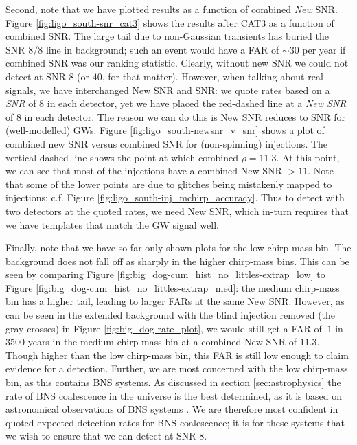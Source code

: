 Second, note that we have plotted results as a function of combined \emph{New}
\ac{SNR}. Figure \ref{fig:ligo_south-snr_cat3} shows the results after CAT3 as
a function of combined \ac{SNR}. The large tail due to non-Gaussian transients
has buried the \ac{SNR} 8/8 line in background; such an event would have a
\ac{FAR} of $\sim30$ per year if combined \ac{SNR} was our ranking statistic.
Clearly, without new \ac{SNR} we could not detect at \ac{SNR} $8$ (or $40$, for
that matter). However, when talking about real signals, we have interchanged
New \ac{SNR} and \ac{SNR}: we quote rates based on a \emph{\ac{SNR}} of $8$ in
each detector, yet we have placed the red-dashed line at a \emph{New \ac{SNR}}
of $8$ in each detector. The reason we can do this is New \ac{SNR} reduces to
\ac{SNR} for (well-modelled) \acp{GW}. Figure \ref{fig:ligo_south-newsnr_v_snr}
shows a plot of combined new \ac{SNR} versus combined \ac{SNR} for
(non-spinning) injections. The vertical dashed line shows the point at which
combined $\rho = 11.3$. At this point, we can see that most of the injections
have a combined New \ac{SNR} $> 11$. Note that some of the lower points are due
to glitches being mistakenly mapped to injections; c.f. Figure
\ref{fig:ligo_south-inj_mchirp_accuracy}. Thus to detect with two detectors at
the quoted rates, we need New \ac{SNR}, which in-turn requires that we have
templates that match the \ac{GW} signal well.

Finally, note that we have so far only shown plots for the low chirp-mass bin.
The background does not fall off as sharply in the higher chirp-mass bins. This
can be seen by comparing Figure
\ref{fig:big_dog-cum_hist_no_littles-extrap_low} to Figure
\ref{fig:big_dog-cum_hist_no_littles-extrap_med}: the medium chirp-mass bin has
a higher tail, leading to larger \acp{FAR} at the same New \ac{SNR}. However,
as can be seen in the extended background with the blind injection removed (the
gray crosses) in Figure \ref{fig:big_dog-rate_plot}, we would still get a
\ac{FAR} of $~1$ in $3500$ years in the medium chirp-mass bin at a combined New
\ac{SNR} of $11.3$.  Though higher than the low chirp-mass bin, this \ac{FAR}
is still low enough to claim evidence for a detection. Further, we are most
concerned with the low chirp-mass bin, as this contains \ac{BNS} systems. As
discussed in section \ref{sec:astrophysics} the rate of \ac{BNS} coalescence in
the universe is the best determined, as it is based on astronomical
observations of \ac{BNS} systems \cite{ratesdoc}. We are therefore most
confident in quoted expected detection rates for \ac{BNS} coalescence; it is
for these systems that we wish to ensure that we can detect at \ac{SNR} 8.

